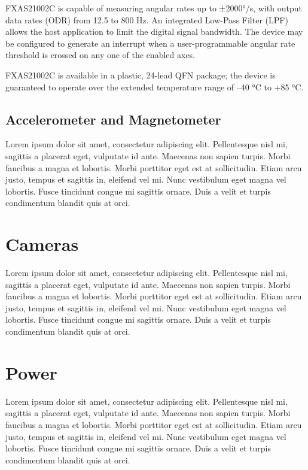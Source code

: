 \documentclass[letterpaper]{report}
\begin{document}
FXAS21002C is capable of measuring angular rates up to ±2000°/s, with output data rates (ODR) from 12.5 to 800 Hz. An integrated Low-Pass Filter (LPF) allows the host application to
limit the digital signal bandwidth. The device may be configured to generate an interrupt when a user-programmable angular rate threshold is crossed on any one of the enabled axes.

FXAS21002C is available in a plastic, 24-lead QFN package; the device is guaranteed to operate over the extended temperature range of –40 °C to +85 °C.

\section{Accelerometer and Magnetometer}
Lorem ipsum dolor sit amet, consectetur adipiscing elit. Pellentesque nisl mi, sagittis a placerat eget, vulputate id ante. Maecenas non sapien turpis. Morbi faucibus a magna et lobortis. Morbi porttitor eget est at sollicitudin. Etiam arcu justo, tempus et sagittis in, eleifend vel mi. Nunc vestibulum eget magna vel lobortis. Fusce tincidunt congue mi sagittis ornare. Duis a velit et turpis condimentum blandit quis at orci.

\chapter{Cameras}
Lorem ipsum dolor sit amet, consectetur adipiscing elit. Pellentesque nisl mi, sagittis a placerat eget, vulputate id ante. Maecenas non sapien turpis. Morbi faucibus a magna et lobortis. Morbi porttitor eget est at sollicitudin. Etiam arcu justo, tempus et sagittis in, eleifend vel mi. Nunc vestibulum eget magna vel lobortis. Fusce tincidunt congue mi sagittis ornare. Duis a velit et turpis condimentum blandit quis at orci.

\chapter{Power}
Lorem ipsum dolor sit amet, consectetur adipiscing elit. Pellentesque nisl mi, sagittis a placerat eget, vulputate id ante. Maecenas non sapien turpis. Morbi faucibus a magna et lobortis. Morbi porttitor eget est at sollicitudin. Etiam arcu justo, tempus et sagittis in, eleifend vel mi. Nunc vestibulum eget magna vel lobortis. Fusce tincidunt congue mi sagittis ornare. Duis a velit et turpis condimentum blandit quis at orci.
\end{document}
